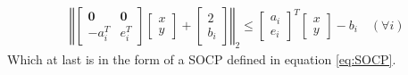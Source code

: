 \begin{align*}
    & \left\Vert\begin{bmatrix} \mathbf{0} & \mathbf{0} \\ -a_i^T & e_i^T \end{bmatrix}\begin{bmatrix} x \\ y \end{bmatrix} + \begin{bmatrix} 2 \\ b_i \end{bmatrix} \right\Vert_2 \le \begin{bmatrix} a_i \\ e_i \end{bmatrix}^T \begin{bmatrix} x \\ y \end{bmatrix} - b_i \quad (\forall i)
\end{align*}
Which at last is in the form of a SOCP defined in equation \ref{eq:SOCP}.

